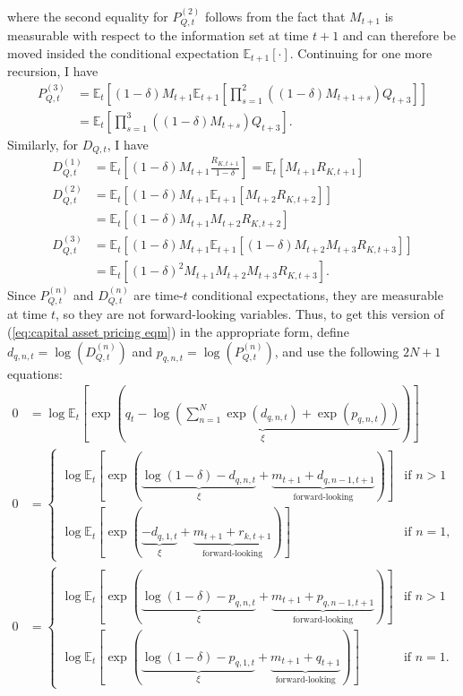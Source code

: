 \documentclass[12 pt, oneside]{article}
\theoremstyle{definition}
\theoremstyle{definition}
\theoremstyle{definition}
\newcommand{\E}{\mathbb{E}}
\begin{document}
where the second equality for $P_{Q, t}^{(2)}$ follows from the fact that $M_{t + 1}$ is measurable with respect to the information set at time $t + 1$ and can
therefore be moved insided the conditional expectation $\E_{t + 1}[\cdot]$. Continuing for one more recursion, I have
\begin{align*}
  P_{Q, t}^{(3)} & = \E_t\left[(1 - \delta)M_{t + 1}\E_{t + 1}\left[\prod_{s = 1}^2((1 - \delta)M_{t + 1 + s}) Q_{t + 3}\right]\right]\\
                 & = \E_t\left[\prod_{s = 1}^3((1 - \delta)M_{t + s}) Q_{t + 3}\right].
\end{align*}
Similarly, for $D_{Q, t}$, I have
\begin{align*}
  D_{Q, t}^{(1)} & = \E_t\left[(1 - \delta)M_{t + 1}\frac{R_{K, t + 1}}{1 - \delta}\right] = \E_t[M_{t + 1} R_{K, t + 1}]\\
  D_{Q, t}^{(2)} & = \E_t[(1 - \delta)M_{t + 1}\E_{t + 1}[M_{t + 2}R_{K, t + 2}]]\\
                 & = \E_t[(1 - \delta)M_{t + 1}M_{t + 2}R_{K, t + 2}]\\
  D_{Q, t}^{(3)} & = \E_t[(1 - \delta)M_{t + 1}\E_{t + 1}[(1 - \delta)M_{t + 2}M_{t + 3}R_{K, t + 3}]]\\
                 & = \E_t[(1 - \delta)^2M_{t + 1}M_{t + 2}M_{t + 3}R_{K, t + 3}].
\end{align*}
Since $P_{Q, t}^{(n)}$ and $D_{Q, t}^{(n)}$ are time-$t$ conditional expectations, they are measurable at time $t$, so they are not forward-looking variables. Thus, to get this version of (\ref{eq:capital asset pricing eqm}) in the appropriate form, define $d_{q, n, t} = \log(D_{Q, t}^{(n)})$ and $p_{q, n, t} = \log(P_{Q, t}^{(n)})$, and use the following $2N + 1$ equations:
\begin{align}
  0 & = \log\E_t\left[\exp\left(\underbrace{q_t - \log\left(\sum_{n = 1}^{N}\exp(d_{q, n, t}) + \exp(p_{q, n, t})\right)}_{\xi}\right)\right]\\
  0 & =
      \begin{cases}
        \log\E_t\left[\exp\left(\underbrace{\log(1 - \delta) - d_{q, n, t}}_{\xi} + \underbrace{m_{t + 1} + d_{q, n - 1, t + 1}}_{\text{forward-looking}}\right)\right] & \text{if } n > 1\\
        \log\E_t\left[\exp\left(\underbrace{- d_{q, 1, t}}_{\xi} + \underbrace{m_{t + 1} + r_{k, t + 1}}_{\text{forward-looking}} \right)\right] & \text{if } n = 1,
      \end{cases}\\
  0 & =
      \begin{cases}
        \log\E_t\left[\exp\left(\underbrace{\log(1 - \delta)- p_{q, n, t}}_{\xi} + \underbrace{m_{t + 1} + p_{q, n - 1, t + 1}}_{\text{forward-looking}} \right)\right] & \text{if } n > 1\\
        \log\E_t\left[\exp\left(\underbrace{\log(1 - \delta) - p_{q, 1, t}}_{\xi} + \underbrace{m_{t + 1} + q_{t + 1}}_{\text{forward-looking}}\right)\right] & \text{if }n = 1.
      \end{cases}
\end{align}
\end{document}
